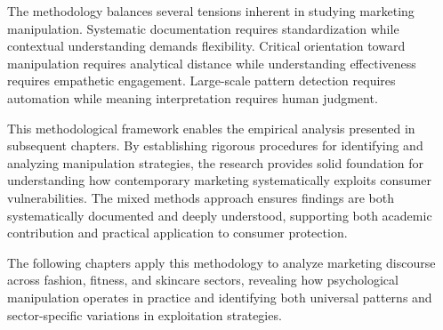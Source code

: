 The methodology balances several tensions inherent in studying marketing manipulation. Systematic documentation requires standardization while contextual understanding demands flexibility. Critical orientation toward manipulation requires analytical distance while understanding effectiveness requires empathetic engagement. Large-scale pattern detection requires automation while meaning interpretation requires human judgment.

This methodological framework enables the empirical analysis presented in subsequent chapters. By establishing rigorous procedures for identifying and analyzing manipulation strategies, the research provides solid foundation for understanding how contemporary marketing systematically exploits consumer vulnerabilities. The mixed methods approach ensures findings are both systematically documented and deeply understood, supporting both academic contribution and practical application to consumer protection.

The following chapters apply this methodology to analyze marketing discourse across fashion, fitness, and skincare sectors, revealing how psychological manipulation operates in practice and identifying both universal patterns and sector-specific variations in exploitation strategies.
